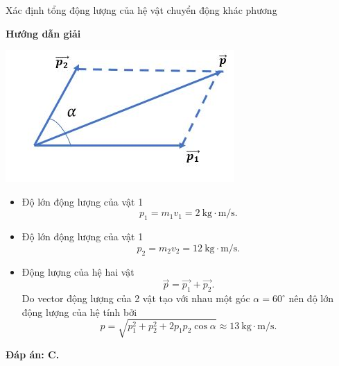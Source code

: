 \begin{dang}{Xác định tổng động lượng của hệ vật chuyển động khác phương}
	{	\begin{center}
			\textbf{Hướng dẫn giải}
		\end{center}
		
		\begin{center}
			\includegraphics[scale=0.6]{../figs/VN10-PH-29-L-021-2-9.JPG}
		\end{center}
		\begin{itemize}
			\item Độ lớn động lượng của vật 1
			\begin{equation*}
				p_1=m_1v_1 =2\ \text{kg} \cdot \text{m/s}. 
			\end{equation*}
			\item Độ lớn động lượng của vật 1
			\begin{equation*}
				p_2=m_2v_2 =12\ \text{kg} \cdot \text{m/s}. 
			\end{equation*}
			\item Động lượng của hệ hai vật 
			\begin{equation*}
				\vec{p}=\vec{p_1}+\vec{p_2}.
			\end{equation*}
			Do vector động lượng của 2 vật tạo với nhau một góc $\alpha = 60^\circ$ nên độ lớn động lượng của hệ tính bởi 
			\begin{equation*}
				p= \sqrt{p_1^2+p_2^2 +2p_1p_2\cos \alpha}\approx 13\ \text{kg} \cdot \text{m/s}.
			\end{equation*}
		\end{itemize}
		\textbf{Đáp án: C.}
		
}
\end{dang}
